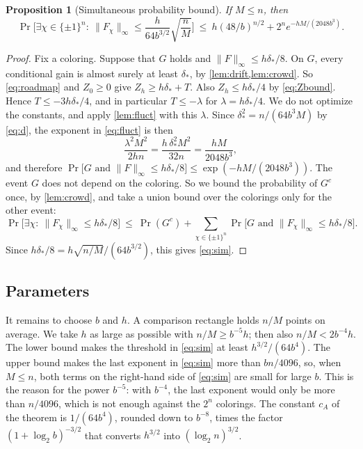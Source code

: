 \documentclass[11pt,letterpaper]{article}
\newtheorem{proposition}[theorem]{Proposition}
\newcommand{\1}{\mathbf{1}}
\newcommand{\Fnorm}[1]{\lVert #1\rVert_\infty}
\newcommand{\pmone}{\{\pm1\}}
\begin{document}
\begin{proposition}[Simultaneous probability bound]\label{prop:sim}
If $M\le n$, then
\begin{equation}\label{eq:sim}
\Pr\biggl[\exists\chi\in\pmone^n:\ \Fnorm{F_\chi}\le\frac h{64b^{3/2}}\sqrt{\frac nM}\biggr]\ \le\ h(48/b)^{n/2}+2^ne^{-hM/(2048b^3)}.
\end{equation}
\end{proposition}

\begin{proof}
Fix a coloring. Suppose that $G$ holds and $\Fnorm F\le h\delta_*/8$. On $G$, every conditional gain is almost surely at least $\delta_*$, by \cref{lem:drift,lem:crowd}. So \eqref{eq:roadmap} and $Z_0\ge0$ give $Z_h\ge h\delta_*+T$. Also $Z_h\le h\delta_*/4$ by \eqref{eq:Zbound}. Hence $T\le-3h\delta_*/4$, and in particular $T\le-\lambda$ for $\lambda=h\delta_*/4$. We do not optimize the constants, and apply \cref{lem:fluct} with this $\lambda$. Since $\delta_*^2=n/(64b^3M)$ by \eqref{eq:d}, the exponent in \eqref{eq:fluct} is then
\[
\frac{\lambda^2M^2}{2hn}=\frac{h\,\delta_*^2M^2}{32n}=\frac{hM}{2048b^3},
\]
and therefore $\Pr\bigl[G\text{ and }\Fnorm F\le h\delta_*/8\bigr]\le\exp(-hM/(2048b^3))$. The event $G$ does not depend on the coloring. So we bound the probability of $G^c$ once, by \cref{lem:crowd}, and take a union bound over the colorings only for the other event:
\[
\Pr\bigl[\exists\chi:\ \Fnorm{F_\chi}\le h\delta_*/8\bigr]\ \le\ \Pr(G^c)+\sum_{\chi\in\pmone^n}\Pr\bigl[G\text{ and }\Fnorm{F_\chi}\le h\delta_*/8\bigr].
\]
Since $h\delta_*/8=h\sqrt{n/M}/(64b^{3/2})$, this gives \eqref{eq:sim}.
\end{proof}

\subsection{Parameters}

It remains to choose $b$ and $h$. A comparison rectangle holds $n/M$ points on average. We take $h$ as large as possible with $n/M\ge b^{-5}h$; then also $n/M<2b^{-4}h$. The lower bound makes the threshold in \eqref{eq:sim} at least $h^{3/2}/(64b^4)$. The upper bound makes the last exponent in \eqref{eq:sim} more than $bn/4096$, so, when $M\le n$, both terms on the right-hand side of \eqref{eq:sim} are small for large $b$. This is the reason for the power $b^{-5}$: with $b^{-4}$, the last exponent would only be more than $n/4096$, which is not enough against the $2^n$ colorings. The constant $c_A$ of the theorem is $1/(64b^4)$, rounded down to $b^{-8}$, times the factor $(1+\log_2b)^{-3/2}$ that converts $h^{3/2}$ into $(\log_2n)^{3/2}$.
\end{document}
